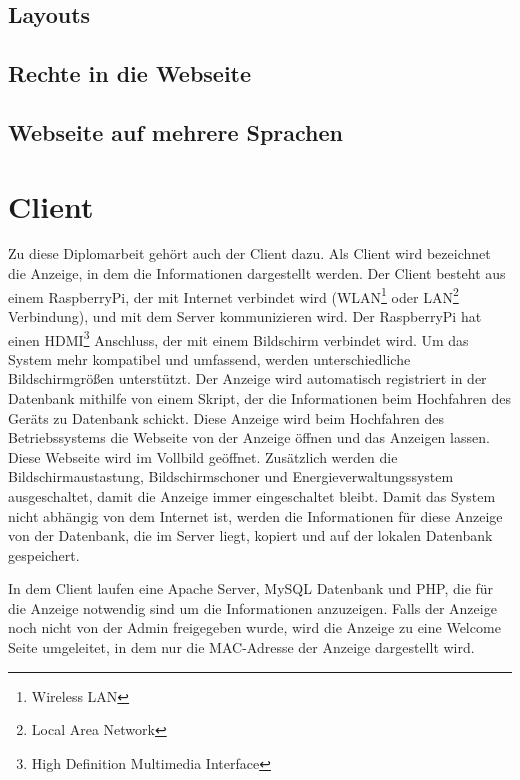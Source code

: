 \subsection{Layouts}



\subsection{Rechte in die Webseite}



\subsection{Webseite auf mehrere Sprachen}

\section{Client}

Zu diese Diplomarbeit geh\"{o}rt auch der Client dazu. Als Client wird bezeichnet die Anzeige, in dem die Informationen dargestellt werden. Der Client besteht aus einem RaspberryPi, der mit Internet verbindet wird (WLAN\footnote{Wireless LAN} oder LAN\footnote{Local Area Network} Verbindung), und mit dem Server kommunizieren wird. Der RaspberryPi hat einen HDMI\footnote{High Definition Multimedia Interface} Anschluss, der mit einem Bildschirm verbindet wird. Um das System mehr kompatibel und umfassend, werden unterschiedliche Bildschirmgr\"{o}\ss{}en unterst\"{u}tzt. Der Anzeige wird automatisch registriert in der Datenbank mithilfe von einem Skript, der die Informationen beim Hochfahren des Ger\"{a}ts zu Datenbank schickt. Diese Anzeige wird beim Hochfahren des Betriebssystems die Webseite von der Anzeige \"{o}ffnen und das Anzeigen lassen. Diese Webseite wird im Vollbild ge\"{o}ffnet. Zus\"{a}tzlich werden die Bildschirmaustastung, Bildschirmschoner und Energieverwaltungssystem ausgeschaltet, damit die Anzeige immer eingeschaltet bleibt. Damit das System nicht abh\"{a}ngig von dem Internet ist, werden die Informationen f\"{u}r diese Anzeige von der Datenbank, die im Server liegt, kopiert und auf der lokalen Datenbank gespeichert. 

In dem Client laufen eine Apache Server, MySQL Datenbank und PHP, die f\"{u}r die Anzeige notwendig sind um die Informationen anzuzeigen. Falls der Anzeige noch nicht von der Admin freigegeben wurde, wird die Anzeige zu eine Welcome Seite umgeleitet, in dem nur die MAC-Adresse der Anzeige dargestellt wird.





